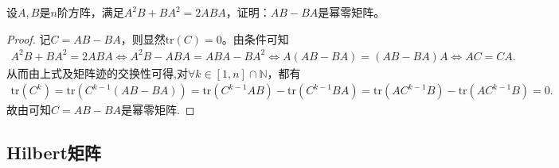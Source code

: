 \documentclass[../../main.tex]{subfiles}%
\begin{document}
\begin{example}
设$A,B$是$n$阶方阵，满足$A^2B + BA^2 = 2ABA$，证明：$AB - BA$是幂零矩阵。 
\end{example}
\begin{proof}
记$C = AB - BA$，则显然$\mathrm{tr}(C)=0$。由条件可知
\begin{align*}
A^2B + BA^2 = 2ABA \Longleftrightarrow A^2B - ABA = ABA - BA^2 
\Longleftrightarrow A(AB - BA) = (AB - BA)A \Longleftrightarrow AC = CA.
\end{align*}
从而由上式及矩阵迹的交换性可得,对$\forall k\in [1,n]\cap \mathbb{N}$，都有
\begin{align*}
\mathrm{tr}(C^k) = \mathrm{tr}(C^{k - 1}(AB - BA)) = \mathrm{tr}(C^{k - 1}AB) - \mathrm{tr}(C^{k - 1}BA) 
= \mathrm{tr}(AC^{k - 1}B) - \mathrm{tr}(AC^{k - 1}B) = 0.
\end{align*}
故由可知$C=AB-BA$是幂零矩阵.
\end{proof}

\subsection{Hilbert矩阵}
\end{document}

